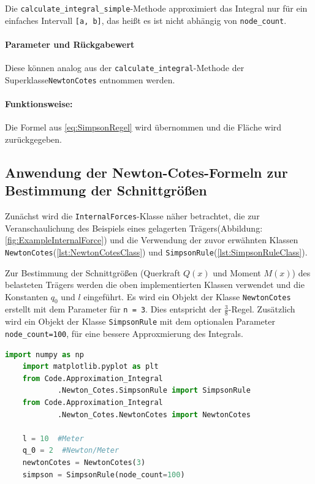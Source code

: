 Die \texttt{calculate\_integral\_simple}-Methode approximiert das Integral nur für ein einfaches Intervall \texttt{[a, b]}, das heißt es ist nicht abhängig von \texttt{node\_count}.

\paragraph{Parameter und Rückgabewert}
Diese können analog aus der \texttt{calculate\_integral}-Methode der Superklasse\texttt{NewtonCotes} entnommen werden.

\paragraph{Funktionsweise:}
Die Formel aus \ref{eq:SimpsonRegel} wird übernommen und die Fläche wird zurückgegeben.

\subsection{Anwendung der Newton-Cotes-Formeln zur Bestimmung der Schnittgrößen}

Zunächst wird die \texttt{InternalForces}-Klasse näher betrachtet, die zur Veranschaulichung des Beispiels eines gelagerten Trägers(Abbildung: \ref{fig:ExampleInternalForce}) und die Verwendung der zuvor erwähnten Klassen \texttt{NewtonCotes}(\ref{lst:NewtonCotesClass}) und \texttt{SimpsonRule}(\ref{lst:SimpsonRuleClass}).

Zur Bestimmung der Schnittgrößen (Querkraft $Q(x)$ und Moment $M(x)$) des belasteten Trägers werden die oben implementierten Klassen verwendet und die Konstanten $q_0$ und $l$ eingeführt. Es wird ein Objekt der Klasse \texttt{NewtonCotes} erstellt mit dem Parameter für \texttt{n = 3}. Dies entspricht der $\frac{3}{8}$-Regel. Zusätzlich wird ein Objekt der Klasse \texttt{SimpsonRule} mit dem optionalen Parameter \texttt{node\_count=100}, für eine bessere Approxmierung des Integrals.

\begin{lstlisting}[language=Python]
    import numpy as np
    import matplotlib.pyplot as plt
    from Code.Approximation_Integral
            .Newton_Cotes.SimpsonRule import SimpsonRule
    from Code.Approximation_Integral
            .Newton_Cotes.NewtonCotes import NewtonCotes
    
    l = 10  #Meter
    q_0 = 2  #Newton/Meter
    newtonCotes = NewtonCotes(3)
    simpson = SimpsonRule(node_count=100)
\end{lstlisting}

